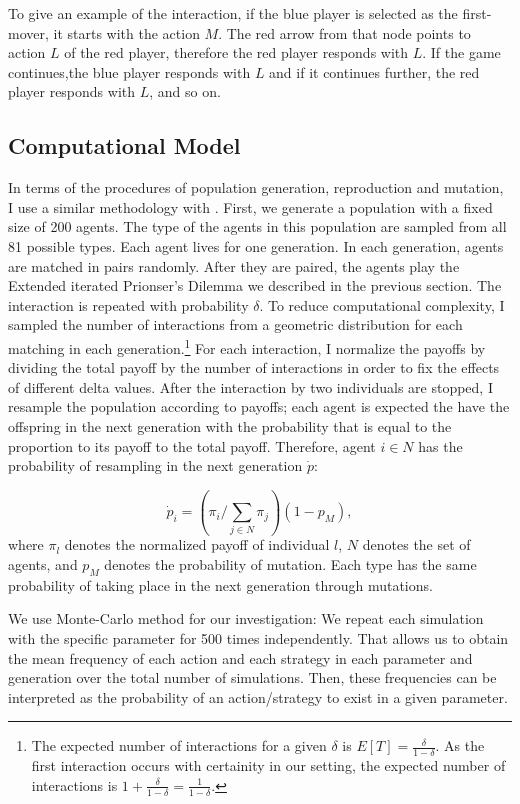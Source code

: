 \documentclass[12pt]{article}
\begin{document}
To give an example of the interaction, if the blue player is selected as the first-mover, it starts with the action $M$. The red arrow from that node points to action $L$ of the red player, therefore the red player responds with $L$. If the game continues,the blue player responds with $L$ and if it continues further, the red player responds with $L$, and so on. 

\subsection*{Computational Model}

In terms of the procedures of population generation, reproduction and mutation, I use a similar methodology with \citet{Van_Veelen2012-xf}. First, we generate a population with a fixed size of 200 agents. The type of the agents in this population are sampled from all 81 possible types. Each agent lives for one generation. In each generation, agents are matched in pairs randomly. After they are paired, the agents play the Extended iterated Prionser's Dilemma we described in the previous section. The interaction is repeated with probability $\delta$. To reduce computational complexity, I sampled the number of interactions from a geometric distribution for each matching in each generation.\footnote{The expected number of interactions for a given $\delta$ is $E[T] = \frac{\delta}{1-\delta}$. As the first interaction occurs with certainity in our setting, the expected number of interactions is $1 +\frac{\delta}{1-\delta} = \frac{1}{1-\delta}.$} For each interaction, I normalize the payoffs by dividing the total payoff by the number of interactions in order to fix the effects of different delta values. After the interaction by two individuals are stopped, I resample the population according to payoffs; each agent is expected the have the offspring in the next generation with the probability that is equal to the proportion to its payoff to the total payoff. Therefore, agent $i \in N$ has the probability of resampling in the next generation $\dot{p}$:

$$ \dot{p}_i  = (\pi_i/\sum\limits_{j \in N}\pi_j)(1-p_M),$$ where $\pi_l$ denotes the normalized payoff of individual $l$, $N$ denotes the set of agents, and $p_M$ denotes the probability of mutation. Each type has the same probability of taking place in the next generation through mutations.

We use Monte-Carlo method for our investigation: We repeat each simulation with the specific parameter for 500 times independently. That allows us to obtain the mean frequency of each action and each strategy in each parameter and generation over the total number of simulations. Then, these frequencies can be interpreted as the probability of an action/strategy to exist in a given parameter. 
\end{document}
